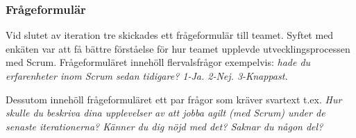\subsubsection {Frågeformulär}
Vid slutet av iteration tre skickades ett frågeformulär till teamet. Syftet med enkäten var att få bättre förståelse för hur teamet upplevde utvecklingsprocessen med Scrum. Frågeformuläret innehöll  flervalsfrågor exempelvis: \textit{hade du erfarenheter inom Scrum sedan tidigare? 1-Ja. 2-Nej. 3-Knappast.}

Dessutom innehöll frågeformuläret ett par frågor som kräver svartext t.ex. \textit{Hur skulle du beskriva dina upplevelser av att jobba agilt (med Scrum) under de senaste iterationerna? Känner du dig nöjd med det? Saknar du någon del?}
\newpage